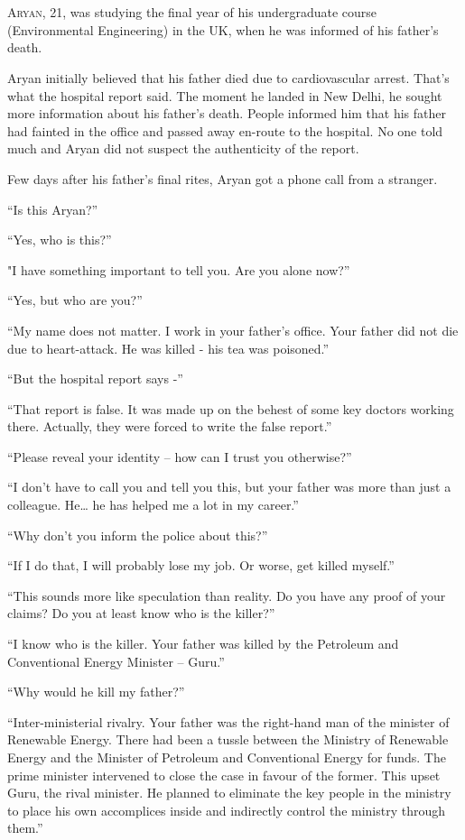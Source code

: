 \chapter{}

\lettrine{A}{ryan}, 21, was studying the final year of his undergraduate course
(Environmental Engineering) in the UK, when he was informed of his father's
death.

Aryan initially believed that his father died due to cardiovascular arrest.
That's what the hospital report said. The moment he landed in New Delhi, he
sought more information about his father's death. People informed him that his
father had fainted in the office and passed away en-route to the hospital. No
one told much and Aryan did not suspect the authenticity of the report.

Few days after his father's final rites, Aryan got a phone call from a stranger.

“Is this Aryan?”

“Yes, who is this?”

"I have something important to tell you. Are you alone now?”

“Yes, but who are you?”

“My name does not matter. I work in your father's office. Your father did not
die due to heart-attack. He was killed - his tea was poisoned.”

“But the hospital report says -”

“That report is false. It was made up on the behest of some key doctors working
there. Actually, they were forced to write the false report.”

“Please reveal your identity – how can I trust you otherwise?”

“I don't have to call you and tell you this, but your father was more than just
a colleague. He… he has helped me a lot in my career.”

“Why don't you inform the police about this?”

“If I do that, I will probably lose my job. Or worse, get killed myself.”

“This sounds more like speculation than reality. Do you have any proof of your
claims? Do you at least know who is the killer?”

“I know who is the killer. Your father was killed by the Petroleum and
Conventional Energy Minister – Guru.”

“Why would he kill my father?”

“Inter-ministerial rivalry. Your father was the right-hand man of the minister
of Renewable Energy. There had been a tussle between the Ministry of Renewable Energy
and the Minister of Petroleum and Conventional Energy for funds. The prime minister
intervened to close the case in favour of the former. This
upset Guru, the rival minister. He planned to eliminate the key people in the
ministry to place his own accomplices inside and indirectly
control the ministry through them.”

